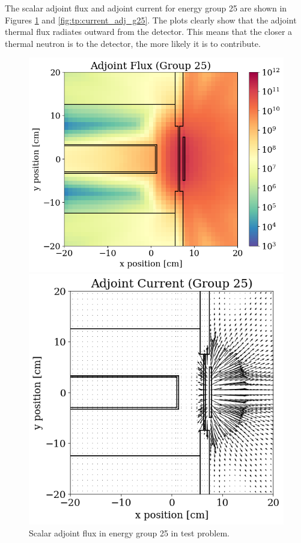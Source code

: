 The scalar adjoint flux and adjoint current for energy group 25 are shown in Figures \ref{fig:tp:scalar_flux_adj_g25} and \ref{fig:tp:current_adj_g25}.
The plots clearly show that the adjoint thermal flux radiates outward from the detector.
This means that the closer a thermal neutron is to the detector, the more likely it is to contribute.

\begin{figure}
  \begin{minipage}{0.54\linewidth}
    \centering
    \includegraphics[width=\linewidth]{content/testprob/scalar_flux_adj_g25.png}
    \caption{Scalar adjoint flux in energy group 25 in test problem.}
    \label{fig:tp:scalar_flux_adj_g25}
  \end{minipage}
  \hfill
  \begin{minipage}{0.45\linewidth}
    \centering
    \includegraphics[width=\linewidth]{content/testprob/current_adj_g25.png}

\end{minipage}
\end{figure}
